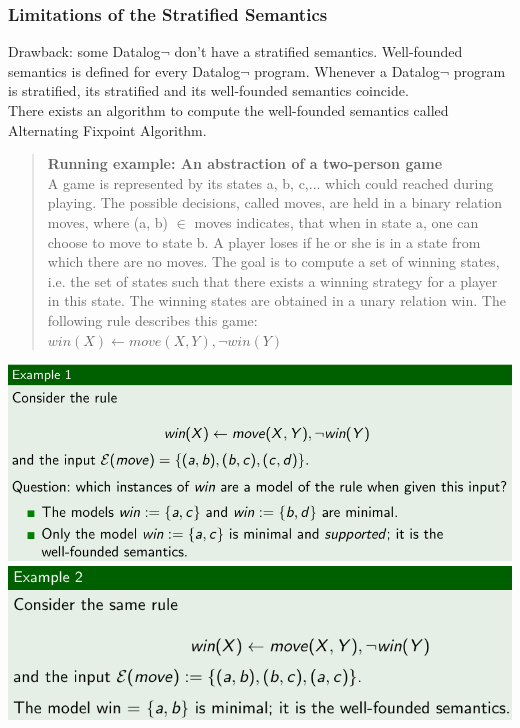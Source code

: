 \documentclass{article}
\begin{document}
\subsubsection{Limitations of the Stratified Semantics}
Drawback: some Datalog$\neg$ don’t have a stratified semantics. Well-founded semantics is defined for every Datalog$\neg$ program. Whenever a Datalog$\neg$ program is stratified, its stratified and its well-founded semantics coincide.\\
There exists an algorithm to compute the well-founded semantics called Alternating Fixpoint Algorithm.\\
\begin{quote}
\textbf{Running example: An abstraction of a two-person game}\\
A game is represented by its states a, b, c,... which could reached during playing. The
possible decisions, called moves, are held in a binary relation moves, where (a, b) $\in$ moves indicates, that when in state a, one can choose to move to state b. A player loses if he or she is in a state from which there are no moves. The goal is to compute a set of winning states, i.e. the set of states such that there exists a winning strategy for a player in this state. The winning states are obtained in a unary relation win. The following rule describes this game:\\
$win(X) \leftarrow move(X,Y),\neg win(Y)$
\end{quote}
\includegraphics[scale=0.3]{102.png}\\
\includegraphics[scale=0.3]{103.png}\\
\end{document}
